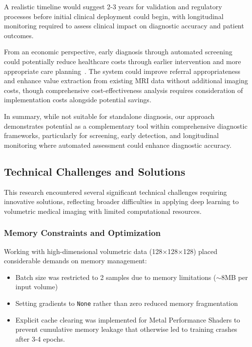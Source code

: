 \documentclass[12pt, a4paper]{article}
\begin{document}
A realistic timeline would suggest 2-3 years for validation and regulatory processes before initial clinical deployment could begin, with longitudinal monitoring required to assess clinical impact on diagnostic accuracy and patient outcomes.

From an economic perspective, early diagnosis through automated screening could potentially reduce healthcare costs through earlier intervention and more appropriate care planning~\cite{jack2018nia}. The system could improve referral appropriateness and enhance value extraction from existing MRI data without additional imaging costs, though comprehensive cost-effectiveness analysis requires consideration of implementation costs alongside potential savings.

In summary, while not suitable for standalone diagnosis, our approach demonstrates potential as a complementary tool within comprehensive diagnostic frameworks, particularly for screening, early detection, and longitudinal monitoring where automated assessment could enhance diagnostic accuracy.

\subsection{Technical Challenges and Solutions}

This research encountered several significant technical challenges requiring innovative solutions, reflecting broader difficulties in applying deep learning to volumetric medical imaging with limited computational resources.

\subsubsection{Memory Constraints and Optimization}

Working with high-dimensional volumetric data (128×128×128) placed considerable demands on memory management:

\begin{itemize}
    \item Batch size was restricted to 2 samples due to memory limitations ($\sim$8MB per input volume)
    \item Setting gradients to \texttt{None} rather than zero reduced memory fragmentation
    \item Explicit cache clearing was implemented for Metal Performance Shaders to prevent cumulative memory leakage that otherwise led to training crashes after 3-4 epochs.
\end{itemize}
\end{document}
